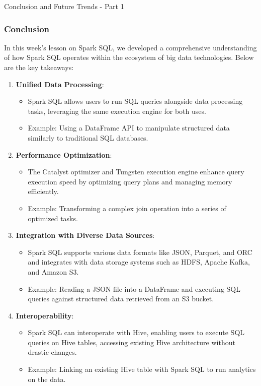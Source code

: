 \documentclass[aspectratio=169]{beamer}
\begin{document}
\begin{frame}[fragile]{Conclusion and Future Trends - Part 1}
    \frametitle{Conclusion}
    In this week’s lesson on Spark SQL, we developed a comprehensive understanding of how Spark SQL operates within the ecosystem of big data technologies. Below are the key takeaways:
    
    \begin{enumerate}
        \item \textbf{Unified Data Processing}:
        \begin{itemize}
            \item Spark SQL allows users to run SQL queries alongside data processing tasks, leveraging the same execution engine for both uses.
            \item Example: Using a DataFrame API to manipulate structured data similarly to traditional SQL databases.
        \end{itemize}
        
        \item \textbf{Performance Optimization}:
        \begin{itemize}
            \item The Catalyst optimizer and Tungsten execution engine enhance query execution speed by optimizing query plans and managing memory efficiently.
            \item Example: Transforming a complex join operation into a series of optimized tasks.
        \end{itemize}
        
        \item \textbf{Integration with Diverse Data Sources}:
        \begin{itemize}
            \item Spark SQL supports various data formats like JSON, Parquet, and ORC and integrates with data storage systems such as HDFS, Apache Kafka, and Amazon S3.
            \item Example: Reading a JSON file into a DataFrame and executing SQL queries against structured data retrieved from an S3 bucket.
        \end{itemize}
        
        \item \textbf{Interoperability}:
        \begin{itemize}
            \item Spark SQL can interoperate with Hive, enabling users to execute SQL queries on Hive tables, accessing existing Hive architecture without drastic changes.
            \item Example: Linking an existing Hive table with Spark SQL to run analytics on the data.
        \end{itemize}
    \end{enumerate}
\end{frame}
\end{document}
